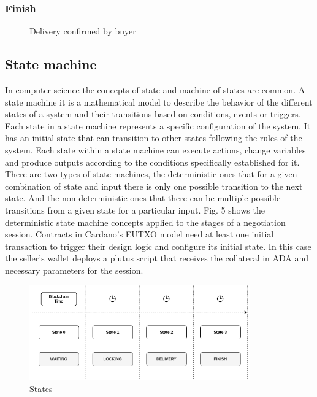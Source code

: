 \documentclass[12pt]{article}
\begin{document}
\subsubsection { Finish }

\begin{figure}[ht]
  \centering
  
  \caption{Delivery confirmed by buyer}
  \label{fig:delivered}
\end{figure}




\subsection { State machine }

In computer science the concepts of state and machine of states are common. A state machine it is a mathematical model to describe the behavior of the different states of a system and their transitions based on conditions, events or triggers. Each state in a state machine represents a specific configuration of the system. It has an initial state that can transition to other states following the rules of the system. Each state within a state machine can execute actions, change variables and produce outputs according to the conditions specifically established for it. There are two types of state machines, the deterministic ones that for a given combination of state and input there is only one possible transition to the next state. And the non-deterministic ones that there can be multiple possible transitions from a given state for a particular input. Fig. 5 shows the deterministic state machine concepts applied to the stages of a negotiation session. Contracts in Cardano's EUTXO model need at least one initial transaction to trigger their design logic and configure its initial state. In this case the seller's wallet deploys a plutus script that receives the collateral in ADA and necessary parameters for the session. 



\begin{figure}[ht]
  \centering
  \includegraphics[width=0.85\textwidth]{machine.png}
  \caption{States}
  \label{fig:States}
\end{figure} 
\end{document}
